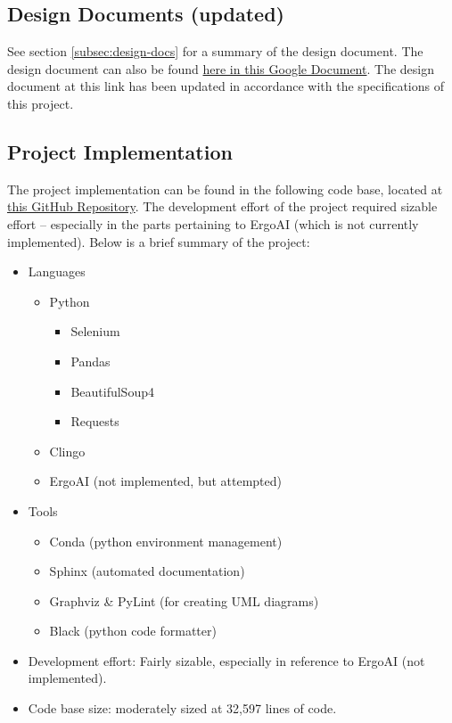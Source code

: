 \documentclass[12pt]{article}
\def \repoLink{https://github.com/AdebayoBraimah/CSE505}
\def \desDocLink{https://docs.google.com/document/d/1t48in8rdzC_VOijfAOP23C_YgAQxkow5eaE7AXEVUYM/edit?usp=sharing}
\begin{document}
    \subsection{Design Documents (updated)}
    \label{subsec:des-doc-up}

    See section \ref{subsec:design-docs} for a summary of the design document. The design document can also be found \href{\desDocLink}{here in this Google Document}. The design document at this link has been updated in accordance with the specifications of this project.

    \subsection{Project Implementation}
    \label{subsec:proj-imp}

    The project implementation can be found in the following code base, located at \href{\repoLink}{this GitHub Repository}. The development effort of the project required sizable effort -- especially in the parts pertaining to ErgoAI (which is not currently implemented). Below is a brief summary of the project:

    \begin{itemize}
        \item Languages
        \begin{itemize}
            \item Python
            \begin{itemize}
                \item Selenium
                \item Pandas
                \item BeautifulSoup4
                \item Requests
            \end{itemize}
            \item Clingo
            \item ErgoAI (not implemented, but attempted)
        \end{itemize}
        \item Tools
            \begin{itemize}
                \item Conda (python environment management)
                \item Sphinx (automated documentation)
                \item Graphviz \& PyLint (for creating UML diagrams)
                \item Black (python code formatter)
            \end{itemize}
        \item Development effort: Fairly sizable, especially in reference to ErgoAI (not implemented).
        \item Code base size: moderately sized at 32,597 lines of code.
    \end{itemize}
\end{document}
